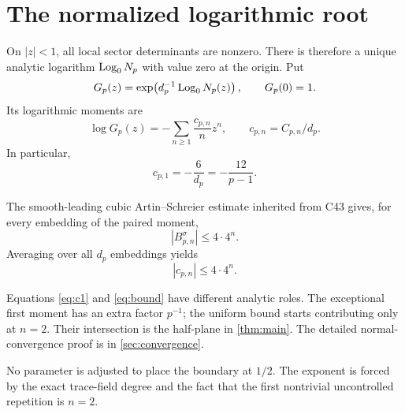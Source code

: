 \section{The normalized logarithmic root}\label{sec:normalized}

On $|z|<1$, all local sector determinants are nonzero.  There is therefore a
unique analytic logarithm $\operatorname{Log}_0 N_p$ with value zero at the origin.  Put
\begin{equation}\label{eq:Gp}
 G_p(z)=\exp\!\left(d_p^{-1}\operatorname{Log}_0 N_p(z)\right),
 \qquad G_p(0)=1.
\end{equation}
Its logarithmic moments are
\[
 \log G_p(z)=-\sum_{n\ge1}\frac{c_{p,n}}n z^n,
 \qquad c_{p,n}=C_{p,n}/d_p.
\]
In particular,
\begin{equation}\label{eq:c1}
 c_{p,1}=-\frac6{d_p}=-\frac{12}{p-1}.
\end{equation}

The smooth-leading cubic Artin--Schreier estimate inherited from C43 gives,
for every embedding of the paired moment,
\[
 |B_{p,n}^{\sigma}|\le4\cdot4^n.
\]
Averaging over all $d_p$ embeddings yields
\begin{equation}\label{eq:bound}
 |c_{p,n}|\le4\cdot4^n.
\end{equation}

Equations \eqref{eq:c1} and \eqref{eq:bound} have different analytic roles.
The exceptional first moment has an extra factor $p^{-1}$; the uniform bound
starts contributing only at $n=2$.  Their intersection is the half-plane in
\cref{thm:main}.  The detailed normal-convergence proof is in
\cref{sec:convergence}.

\begin{remark}
No parameter is adjusted to place the boundary at $1/2$.  The exponent is
forced by the exact trace-field degree and the fact that the first nontrivial
uncontrolled repetition is $n=2$.
\end{remark}

